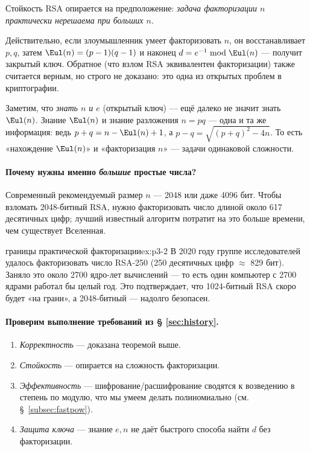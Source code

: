 \begin{importantbox}
Стойкость RSA опирается на предположение: \emph{задача факторизации $n$ практически нерешаема при больших $n$}.
\end{importantbox}

Действительно, если злоумышленник умеет факторизовать $n$, он восстанавливает $p, q$, затем $\Eul(n) = (p-1)(q-1)$ и наконец $d = e^{-1} \bmod \Eul(n)$ --- получит закрытый ключ. Обратное (что взлом RSA эквивалентен факторизации) также считается верным, но строго не доказано: это одна из открытых проблем в криптографии.

Заметим, что \emph{знать $n$ и $e$} (открытый ключ) --- ещё далеко не значит знать $\Eul(n)$. Знание $\Eul(n)$ и знание разложения $n = pq$ --- одна и та же информация: ведь $p + q = n - \Eul(n) + 1$, а $p - q = \sqrt{(p+q)^2 - 4n}$. То есть «нахождение $\Eul(n)$» и «факторизация $n$» --- задачи одинаковой сложности.

\paragraph*{Почему нужны именно \emph{большие} простые числа?} Современный рекомендуемый размер $n$ --- 2048 или даже 4096 бит. Чтобы взломать 2048-битный RSA, нужно факторизовать число длиной около 617 десятичных цифр; лучший известный алгоритм потратит на это больше времени, чем существует Вселенная.

\begin{example}{границы практической факторизации}{ex:p3-2}
В 2020 году группе исследователей удалось факторизовать число RSA-250 (250 десятичных цифр $\approx$ 829 бит). Заняло это около 2700 ядро-лет вычислений --- то есть один компьютер с 2700 ядрами работал бы целый год. Это подтверждает, что 1024-битный RSA скоро будет «на грани», а 2048-битный --- надолго безопасен.
\end{example}

\paragraph*{Проверим выполнение требований из § \ref{sec:history}.}
\begin{enumerate}
  \item \emph{Корректность} --- доказана теоремой выше.
  \item \emph{Стойкость} --- опирается на сложность факторизации.
  \item \emph{Эффективность} --- шифрование/расшифрование сводятся к возведению в степень по модулю, что мы умеем делать полиномиально (см. §~\ref{subsec:fastpow}).
  \item \emph{Защита ключа} --- знание $e, n$ не даёт быстрого способа найти $d$ без факторизации.
\end{enumerate}

